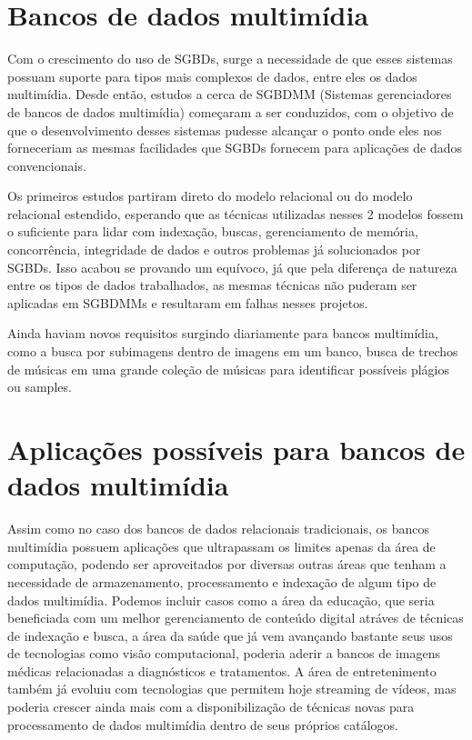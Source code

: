 \documentclass[12pt]{article}
\begin{document}
\section{Bancos de dados multimídia}

Com o crescimento do uso de SGBDs, surge a necessidade de que esses sistemas possuam suporte para tipos mais complexos de dados, entre eles os dados multimídia. Desde então, estudos a cerca de SGBDMM (Sistemas gerenciadores de bancos de dados multimídia) começaram a ser conduzidos, com o objetivo de que o desenvolvimento desses sistemas pudesse alcançar o ponto onde eles nos forneceriam as mesmas facilidades que SGBDs fornecem para aplicações de dados convencionais.

Os primeiros estudos partiram direto do modelo relacional ou do modelo relacional estendido, esperando que as técnicas utilizadas nesses 2 modelos fossem o suficiente para lidar com indexação, buscas, gerenciamento de memória, concorrência, integridade de dados e outros problemas já solucionados por SGBDs. Isso acabou se provando um equívoco, já que pela diferença de natureza entre os tipos de dados trabalhados, as mesmas técnicas não puderam ser aplicadas em SGBDMMs e resultaram em falhas nesses projetos.

Ainda haviam novos requisitos surgindo diariamente para bancos multimídia, como a busca por subimagens dentro de imagens em um banco, busca de trechos de músicas em uma grande coleção de músicas para identificar possíveis plágios ou samples.

\section{Aplicações possíveis para bancos de dados multimídia}

Assim como no caso dos bancos de dados relacionais tradicionais, os bancos multimídia possuem aplicações que ultrapassam os limites apenas da área de computação, podendo ser aproveitados por diversas outras áreas que tenham a necessidade de armazenamento, processamento e indexação de algum tipo de dados multimídia.
Podemos incluir casos como a área da educação, que seria beneficiada com um melhor gerenciamento de conteúdo digital atráves de técnicas de indexação e busca, a área da saúde que já vem avançando bastante seus usos de tecnologias como visão computacional, poderia aderir a bancos de imagens médicas relacionadas a diagnósticos e tratamentos. A área de entretenimento também já evoluiu com tecnologias que permitem hoje streaming de vídeos, mas poderia crescer ainda mais com a disponibilização de técnicas novas para processamento de dados multimídia dentro de seus próprios catálogos.
\end{document}
